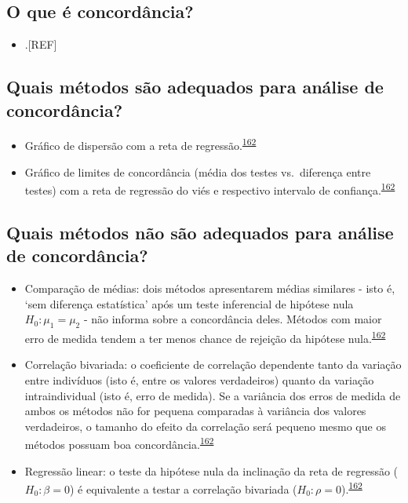 \documentclass[
  a4paper,
]{book}
\providecommand{\tightlist}{%
  \setlength{\itemsep}{0pt}\setlength{\parskip}{0pt}}
\begin{document}
\hypertarget{o-que-uxe9-concorduxe2ncia}{%
\subsection{O que é concordância?}\label{o-que-uxe9-concorduxe2ncia}}

\begin{itemize}
\tightlist
\item
  .{[}REF{]}
\end{itemize}

\hypertarget{quais-muxe9todos-suxe3o-adequados-para-anuxe1lise-de-concorduxe2ncia}{%
\subsection{Quais métodos são adequados para análise de concordância?}\label{quais-muxe9todos-suxe3o-adequados-para-anuxe1lise-de-concorduxe2ncia}}

\begin{itemize}
\item
  Gráfico de dispersão com a reta de regressão.\textsuperscript{\protect\hyperlink{ref-altman1983}{162}}
\item
  Gráfico de limites de concordância (média dos testes vs.~diferença entre testes) com a reta de regressão do viés e respectivo intervalo de confiança.\textsuperscript{\protect\hyperlink{ref-altman1983}{162}}
\end{itemize}

\hypertarget{quais-muxe9todos-nuxe3o-suxe3o-adequados-para-anuxe1lise-de-concorduxe2ncia}{%
\subsection{Quais métodos não são adequados para análise de concordância?}\label{quais-muxe9todos-nuxe3o-suxe3o-adequados-para-anuxe1lise-de-concorduxe2ncia}}

\begin{itemize}
\item
  Comparação de médias: dois métodos apresentarem médias similares - isto é, `sem diferença estatística' após um teste inferencial de hipótese nula \(H_{0}:\mu_{1} = \mu_{2}\) - não informa sobre a concordância deles. Métodos com maior erro de medida tendem a ter menos chance de rejeição da hipótese nula.\textsuperscript{\protect\hyperlink{ref-altman1983}{162}}
\item
  Correlação bivariada: o coeficiente de correlação dependente tanto da variação entre indivíduos (isto é, entre os valores verdadeiros) quanto da variação intraindividual (isto é, erro de medida). Se a variância dos erros de medida de ambos os métodos não for pequena comparadas à variância dos valores verdadeiros, o tamanho do efeito da correlação será pequeno mesmo que os métodos possuam boa concordância.\textsuperscript{\protect\hyperlink{ref-altman1983}{162}}
\item
  Regressão linear: o teste da hipótese nula da inclinação da reta de regressão (\(H_{0}:\beta = 0\)) é equivalente a testar a correlação bivariada (\(H_{0}:\rho = 0\)).\textsuperscript{\protect\hyperlink{ref-altman1983}{162}}
\end{itemize}
\end{document}
